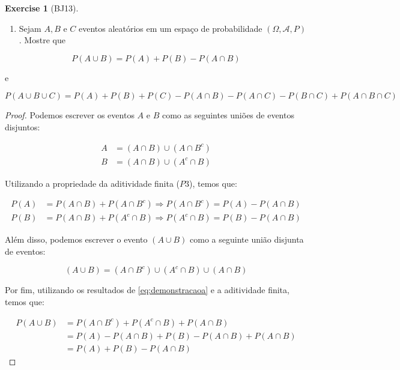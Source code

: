 \documentclass[
]{article}
\providecommand{\tightlist}{%
  \setlength{\itemsep}{0pt}\setlength{\parskip}{0pt}}
\theoremstyle{definition}
\theoremstyle{definition}
\theoremstyle{definition}
\newtheorem{exercise}{Exercise}[section]
\theoremstyle{definition}
\theoremstyle{remark}
\begin{document}
\begin{exercise}[BJ13]
\protect\hypertarget{exr:exbj13}{}\label{exr:exbj13}\leavevmode

\begin{enumerate}
\def\labelenumi{\alph{enumi})}
\tightlist
\item
  Sejam \(A, B \text{ e } C\) eventos aleatórios em um espaço de probabilidade \((\Omega,\mathcal{A},P)\). Mostre que
\end{enumerate}

\begin{equation*}
P(A \cup B) = P(A) + P(B) - P(A \cap B)
\end{equation*}

e

\begin{equation*}
P(A \cup B \cup C) = P(A) + P(B) + P(C) - P(A \cap B) - P(A \cap C) - P(B \cap C) + P(A \cap B \cap C)
\end{equation*}

\begin{proof}
Podemos escrever os eventos \(A\) e \(B\) como as seguintes uniões de eventos disjuntos:

\begin{align*}
A &= (A \cap B) \cup (A \cap B^{c}) \\
B &= (A \cap B) \cup (A^{c} \cap B)
\end{align*}

Utilizando a propriedade da aditividade finita (\(P3\)), temos que:

\begin{equation}
\begin{split}
P(A) &= P(A \cap B) + P(A \cap B^{c}) \Rightarrow P(A \cap B^{c}) = P(A) - P(A \cap B) \\
P(B) &= P(A \cap B) + P(A^{c} \cap B) \Rightarrow P(A^{c} \cap B) = P(B) - P(A \cap B)
\end{split}
\label{eq:demonstracaoa}
\end{equation}

Além disso, podemos escrever o evento \((A \cup B)\) como a seguinte união disjunta de eventos:

\begin{equation*}
(A \cup B) = (A \cap B^{c}) \cup (A^{c} \cap B) \cup (A \cap B)
\end{equation*}

Por fim, utilizando os resultados de \eqref{eq:demonstracaoa} e a aditividade finita, temos que:

\begin{align*}
P(A \cup B) &= P(A \cap B^{c}) + P(A^{c} \cap B) + P(A \cap B) \\
&= P(A) - P(A \cap B) + P(B) - P(A \cap B) + P(A \cap B) \\
&= P(A) + P(B) - P(A \cap B)
\end{align*}


\end{proof}
\end{exercise}
\end{document}
